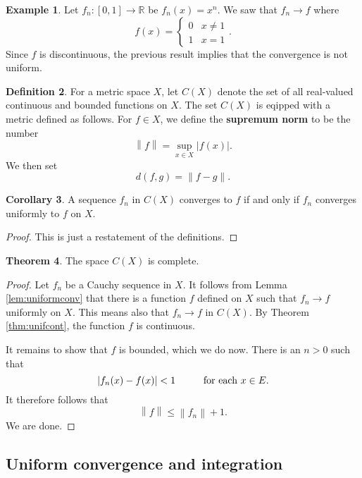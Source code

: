 \documentclass[12pt]{article}
\newcommand{\norm}[1]{\left\lVert#1\right\rVert}
\theoremstyle{definition}
\newtheorem{definition}{Definition}
\newtheorem{example}[definition]{Example}
\theoremstyle{theorem}
\newtheorem{theorem}[definition]{Theorem}
\newtheorem{corollary}[definition]{Corollary}
\begin{document}
\begin{example}
Let $f_n : [0,1] \to \mathbb{R}$ be $f_n(x) = x^n$. We saw that $f_n \to f$ where 
\[
f(x) = \begin{cases}
0 & x \ne 1 \\
1 & x = 1
\end{cases}.
\]
Since $f$ is discontinuous, the previous result implies that the convergence is not uniform. 
\end{example}

\begin{definition}
For a metric space $X$, let $C(X)$ denote the set of all real-valued continuous and bounded functions on $X$. The set $C(X)$ is eqipped with a metric defined as follows. For $f \in X$, we define the \textbf{supremum norm} to be the number 
\[
\norm{f} = \sup_{x \in X}|f(x)|.
\]
We then set 
\[
d(f,g) = \norm{f - g}.
\]
\end{definition}

\begin{corollary}
A sequence $f_n$ in $C(X)$ converges to $f$ if and only if $f_n$ converges uniformly to $f$ on $X$. 
\end{corollary}

\begin{proof}
This is just a restatement of the definitions. 
\end{proof}

\begin{theorem}
The space $C(X)$ is complete. 
\end{theorem}

\begin{proof}
Let $f_n$ be a Cauchy sequence in $X$. It follows from Lemma \ref{lem:uniformconv} that there is a function $f$ defined on $X$ such that $f_n \to f$ uniformly on $X$. This means also that $f_n \to f$ in $C(X)$. By Theorem \ref{thm:unifcont}, the function $f$ is continuous. 

It remains to show that $f$ is bounded, which we do now. There is an $n > 0$ such that 
\[
|f_n(x) - f(x)| < 1 \hspace{10mm} \text{for each $x \in E$.}
\] 
It therefore follows that 
\[
\norm{f} \leqslant \norm{f_n} + 1.
\]
We are done.
\end{proof}

\subsection{Uniform convergence and integration}
\end{document}
